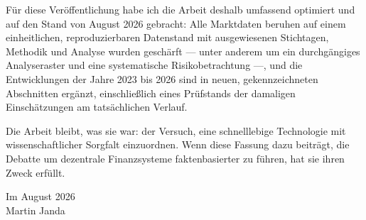 \documentclass[12pt,a4paper,oneside,BCOR=0mm]{scrreprt}
\begin{document}
Für diese Veröffentlichung habe ich die Arbeit deshalb umfassend optimiert und
auf den Stand von August 2026 gebracht: Alle Marktdaten beruhen auf einem
einheitlichen, reproduzierbaren Datenstand mit ausgewiesenen Stichtagen,
Methodik und Analyse wurden geschärft — unter anderem um ein durchgängiges
Analyseraster und eine systematische Risikobetrachtung —, und die
Entwicklungen der Jahre 2023 bis 2026 sind in neuen, gekennzeichneten
Abschnitten ergänzt, einschließlich eines Prüfstands der damaligen
Einschätzungen am tatsächlichen Verlauf.

Die Arbeit bleibt, was sie war: der Versuch, eine schnelllebige Technologie
mit wissenschaftlicher Sorgfalt einzuordnen. Wenn diese Fassung dazu beiträgt,
die Debatte um dezentrale Finanzsysteme faktenbasierter zu führen, hat sie
ihren Zweck erfüllt.

\medskip
\noindent Im August 2026\\
Martin Janda
\clearpage

\tableofcontents
\listoffigures
\listoftables

\end{document}
